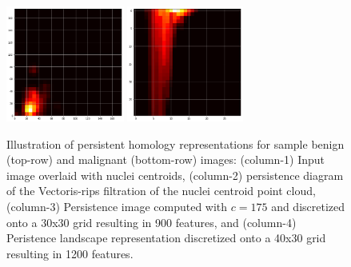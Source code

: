 \documentclass{article}
\begin{document}
\begin{figure}[t]
\includegraphics[height=1.5in]{figures/train_11_pi.png}
\includegraphics[height=1.5in]{figures/train_11_pl.png}
\caption{Illustration of persistent homology representations for sample benign (top-row) and malignant (bottom-row) images: (column-1) Input image overlaid with nuclei centroids, (column-2) persistence diagram of the Vectoris-rips filtration of the nuclei centroid point cloud, (column-3) Persistence image computed with $c=175$ and discretized onto a 30x30 grid resulting in 900 features, and (column-4) Peristence landscape representation discretized onto a 40x30 grid resulting in 1200 features.}
\label{fig:method_illustration}
\end{figure}
%
\end{document}
